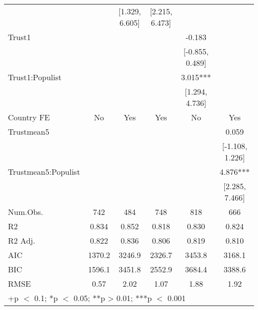 \begin{table}
\begin{tabular}[t]{lccccc}
 &  & {}[1.329, 6.605] & {}[2.215, 6.473] &  & \\
Trust1 &  &  &  & -0.183 & \\
 &  &  &  & {}[-0.855, 0.489] & \\
Trust1:Populist &  &  &  & 3.015*** & \\
 &  &  &  & {}[1.294, 4.736] & \\
Country FE & No & Yes & Yes & No & Yes\\
Trustmean5 &  &  &  &  & 0.059\\
 &  &  &  &  & {}[-1.108, 1.226]\\
Trustmean5:Populist &  &  &  &  & 4.876***\\
 &  &  &  &  & {}[2.285, 7.466]\\
\midrule
Num.Obs. & 742 & 484 & 748 & 818 & 666\\
R2 & 0.834 & 0.852 & 0.818 & 0.830 & 0.824\\
R2 Adj. & 0.822 & 0.836 & 0.806 & 0.819 & 0.810\\
AIC & 1370.2 & 3246.9 & 2326.7 & 3453.8 & 3168.1\\
BIC & 1596.1 & 3451.8 & 2552.9 & 3684.4 & 3388.6\\
RMSE & 0.57 & 2.02 & 1.07 & 1.88 & 1.92\\
\bottomrule
\multicolumn{6}{l}{\rule{0pt}{1em}+p $<$ 0.1; *p $<$ 0.05; **p > 0.01; ***p $<$ 0.001}\\
\end{tabular}
\end{table}
